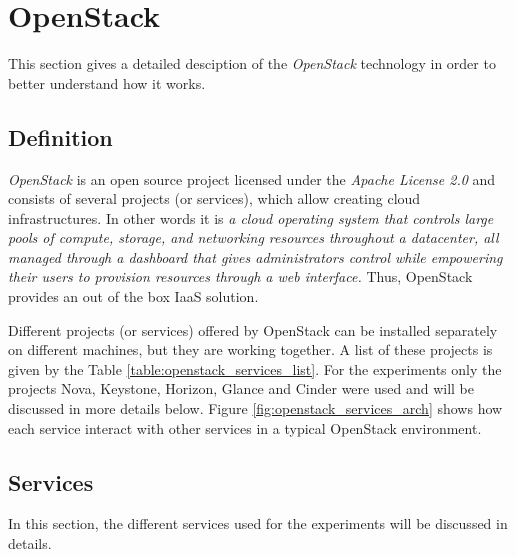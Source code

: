

\chapter{OpenStack}

This section gives a detailed desciption of the \textit{OpenStack} technology in order to better understand how it works.


\section{Definition}
\textit{OpenStack} is an open source project licensed under the \textit{Apache License 2.0} and consists of several projects (or services), which allow creating cloud infrastructures.
In other words it is \textit{a cloud operating system that controls large pools of compute, storage, and networking resources throughout a datacenter, all managed through a dashboard that gives administrators control while empowering their users to provision resources through a web interface.
}\cite{osdef}
Thus, OpenStack provides an out of the box IaaS solution.

Different projects (or services) offered by OpenStack can be installed separately on different machines, but they are working together. 
A list of these projects is given by the Table \ref{table:openstack_services_list}.
For the experiments only the projects Nova, Keystone, Horizon, Glance and Cinder were used and will be discussed in more details below. 
Figure \ref{fig:openstack_services_arch} shows how each service interact with other services in a typical OpenStack environment.


\section{Services}

In this section, the different services used for the experiments will be discussed in details.

